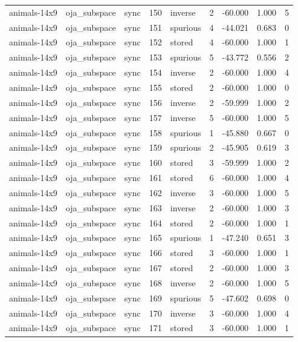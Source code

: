 \begin{tabular}{lllrlrrrr}
animals-14x9 & oja\_subspace & sync & 150 & inverse & 2 & -60.000 & 1.000 & 5 \\
animals-14x9 & oja\_subspace & sync & 151 & spurious & 4 & -44.021 & 0.683 & 0 \\
animals-14x9 & oja\_subspace & sync & 152 & stored & 4 & -60.000 & 1.000 & 1 \\
animals-14x9 & oja\_subspace & sync & 153 & spurious & 5 & -43.772 & 0.556 & 2 \\
animals-14x9 & oja\_subspace & sync & 154 & inverse & 2 & -60.000 & 1.000 & 4 \\
animals-14x9 & oja\_subspace & sync & 155 & stored & 2 & -60.000 & 1.000 & 0 \\
animals-14x9 & oja\_subspace & sync & 156 & inverse & 2 & -59.999 & 1.000 & 2 \\
animals-14x9 & oja\_subspace & sync & 157 & inverse & 5 & -60.000 & 1.000 & 5 \\
animals-14x9 & oja\_subspace & sync & 158 & spurious & 1 & -45.880 & 0.667 & 0 \\
animals-14x9 & oja\_subspace & sync & 159 & spurious & 2 & -45.905 & 0.619 & 3 \\
animals-14x9 & oja\_subspace & sync & 160 & stored & 3 & -59.999 & 1.000 & 2 \\
animals-14x9 & oja\_subspace & sync & 161 & stored & 6 & -60.000 & 1.000 & 4 \\
animals-14x9 & oja\_subspace & sync & 162 & inverse & 3 & -60.000 & 1.000 & 5 \\
animals-14x9 & oja\_subspace & sync & 163 & inverse & 2 & -60.000 & 1.000 & 3 \\
animals-14x9 & oja\_subspace & sync & 164 & stored & 2 & -60.000 & 1.000 & 1 \\
animals-14x9 & oja\_subspace & sync & 165 & spurious & 1 & -47.240 & 0.651 & 3 \\
animals-14x9 & oja\_subspace & sync & 166 & stored & 3 & -60.000 & 1.000 & 1 \\
animals-14x9 & oja\_subspace & sync & 167 & stored & 2 & -60.000 & 1.000 & 3 \\
animals-14x9 & oja\_subspace & sync & 168 & inverse & 2 & -60.000 & 1.000 & 5 \\
animals-14x9 & oja\_subspace & sync & 169 & spurious & 5 & -47.602 & 0.698 & 0 \\
animals-14x9 & oja\_subspace & sync & 170 & inverse & 3 & -60.000 & 1.000 & 4 \\
animals-14x9 & oja\_subspace & sync & 171 & stored & 3 & -60.000 & 1.000 & 1 \\

\end{tabular}
